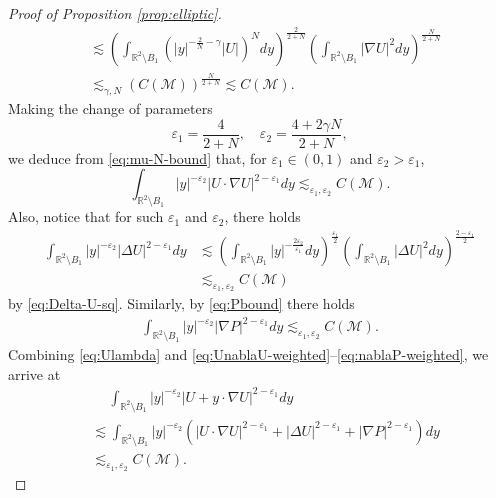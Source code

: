 \documentclass[12pt,reqno]{amsart}
\theoremstyle{plain}
\theoremstyle{definition}
\newcommand{\R}{\mathbb{R}}
\newcommand{\M}{\mathcal{M}}
\renewcommand{\:}{\colon}
\numberwithin{equation}{section}
\numberwithin{figure}{section}
\begin{document}
\begin{proof}[Proof of Proposition \ref{prop:elliptic}]
\begin{align}
        &\lesssim \left( \int_{\R^2 \setminus B_1} \left(|y|^{-\frac{2}{N} - \gamma} |U|\right)^N dy \right)^{\frac{2}{2+N}}  \left( \int_{\R^2 \setminus B_1} |\nabla U|^2 dy \right)^{\frac{N}{2+N}} \nonumber \\
        &\lesssim_{\gamma, N}  (C(\M))^{\frac{N}{2+N}} \lesssim  C(\M).
    \end{align}
    Making the change of parameters
    \begin{equation}
        \varepsilon_1 = \frac{4}{2+N}, \quad \varepsilon_2 = \frac{4+2\gamma N}{2+N},
    \end{equation}
    we deduce from \eqref{eq:mu-N-bound} that, for $\varepsilon_1 \in (0,1)$ and $\varepsilon_2>\varepsilon_1$, 
    \begin{equation} \label{eq:UnablaU-weighted}
        \int_{\R^2 \setminus B_{1}} |y|^{-\varepsilon_2}|U \cdot \nabla U|^{2-\varepsilon_1} dy \lesssim_{ \varepsilon_1, \varepsilon_2} C(\M).
    \end{equation}
    Also, notice that for such $\varepsilon_1$ and $\varepsilon_2$, there holds
    \begin{align} \label{eq:DeltaU-weighted}
        \int_{\R^2 \setminus B_{1}} |y|^{-\varepsilon_2} |\Delta U|^{2-\varepsilon_1} dy &\lesssim \left(\int_{\R^2 \setminus B_1} |y|^{-\frac{2\varepsilon_2}{\varepsilon_1} } dy\right)^{\frac{\varepsilon_1}{2}} \left(\int_{\R^2 \setminus B_1} |\Delta U|^2 dy \right)^{\frac{2-\varepsilon_1}{2}} \nonumber\\ 
        &\lesssim_{\varepsilon_1, \varepsilon_2}  C(\M)
    \end{align}
    by \eqref{eq:Delta-U-sq}. Similarly, by \eqref{eq:Pbound} there holds
     \begin{align} \label{eq:nablaP-weighted}
        \int_{\R^2 \setminus B_{1}} |y|^{-\varepsilon_2} |\nabla P|^{2-\varepsilon_1} dy \lesssim_{\varepsilon_1, \varepsilon_2}   C(\M).
    \end{align}
    Combining \eqref{eq:Ulambda} and \eqref{eq:UnablaU-weighted}--\eqref{eq:nablaP-weighted}, we arrive at
    \begin{align} \label{eq:key-weighted}
        &\quad \ \int_{\R^2 \setminus B_{1}} |y|^{-\varepsilon_2} |U + y \cdot \nabla U|^{2-\varepsilon_1} dy \nonumber \\
        &\lesssim \int_{\R^2 \setminus B_{1}} |y|^{-\varepsilon_2} \left(  |U \cdot \nabla U|^{2-\varepsilon_1} + |\Delta U|^{2-\varepsilon_1} + |\nabla P|^{2-\varepsilon_1}  \right) dy \nonumber \\
        &\lesssim_{\varepsilon_1, \varepsilon_2}  C(\M).
    \end{align}
    

\end{proof}
\end{document}
